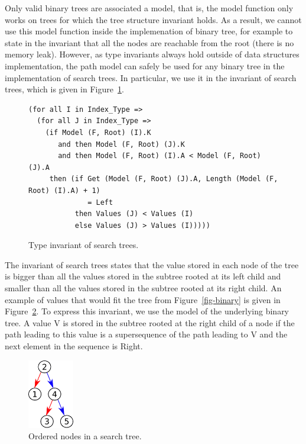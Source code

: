 \documentclass[11pt,a4paper]{article}
\begin{document}
Only valid binary trees are associated a model, that is, the model function
only works on trees for which the tree structure invariant holds. As a result,
we cannot use this model function inside the implemenation of binary tree,
for example to state in the invariant that all the nodes are reachable from the
root (there is no memory leak). However, as type invariants always hold outside
of data structures implementation, the path model can safely be used for any
binary tree in the implementation of search trees. In particular, we use it
in the invariant of search trees, which is given in Figure~\ref{fig-search-inv}.

\begin{figure}[ht]
\begin{small}
\begin{lstlisting}
(for all I in Index_Type =>
  (for all J in Index_Type =>
    (if Model (F, Root) (I).K
       and then Model (F, Root) (J).K
       and then Model (F, Root) (I).A < Model (F, Root) (J).A
     then (if Get (Model (F, Root) (J).A, Length (Model (F, Root) (I).A) + 1)
              = Left
           then Values (J) < Values (I)
           else Values (J) > Values (I)))))
\end{lstlisting}
\end{small}
\caption{\label{fig-search-inv} Type invariant of search trees.}
\end{figure}

The invariant of search trees states that the value stored in each node of the
tree is bigger than all the values stored in the subtree rooted at its left
child and smaller than all the values stored in the subtree rooted at its right
child. An example of values that would fit the tree from Figure~\ref{fig-binary}
is given in Figure~\ref{fig-search}. To express this invariant, we use the
model of the underlying binary tree. A value V is stored in the subtree rooted
at the right child of a node if the path leading to this value is a supersequence
of the path leading to V and the next element in the sequence is Right.

\begin{figure}[ht]
\begin{center}
\includegraphics[width=2cm]{search.pdf}
\caption{\label{fig-search} Ordered nodes in a search tree.}
\end{center}
\end{figure}
\end{document}
